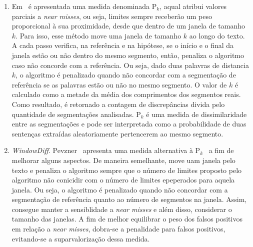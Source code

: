 \begin{enumerate}

\item Em~\cite{Beeferman1999} é apresentada uma medida denominada P$_k$, 
%
aqual atribui valores parciais a \textit{near misses}, ou seja, limites sempre receberão um peso proporcional à sua proximidade, desde que dentro de um janela de tamanho~$k$.
%
Para isso, esse método move uma janela de tamanho $k$ ao longo do texto. 
%
A cada passo verifica, na referência e na hipótese, se o início e o final da janela estão ou não dentro do mesmo segmento,
%
então, penaliza o algoritmo caso não concorde com a referência. Ou seja, dado duas palavras de distancia $k$, o algoritmo é penalizado quando não concordar com a segmentação de referência se as palavras estão ou não no mesmo segmento.
%
O valor de $k$ é calculado como a metade da média dos comprimentos dos segmentos reais. Como resultado, é retornado a contagem de discrepâncias divida pelo quantidade de segmentações analisadas. 
%
P$_k$ é uma medida de dissimilaridade entre as segmentações e pode ser interpretada como a probabilidade de duas sentenças extraídas aleatoriamente pertencerem ao mesmo segmento.

\item \textit{WindowDiff}. Pevzner~\cite{Pevzner2002} 
%
apresenta uma medida alternativa à P$_k$~\cite{Beeferman1999} a fim de melhorar alguns aspectos. 
%
De maneira semelhante, move uam janela pelo texto e penaliza o algoritmo sempre que o número de limites proposto pelo algoritmo não conicidir com o número de limites epeperados para aquela janela. Ou seja, o algoritmo é penalizado quando não concordar com a segmentação de referência quanto ao número de segmentos na janela. 
%
Assim, consegue manter a sensiblidade a \textit{near misses} e além disso, considerar o tamanho das janelas.
%
A fim de melhor equilibrar o peso dos falsos positivos em relação a \textit{near misses}, dobra-se a penalidade para falsos positivos, evitando-se a suparvalorização dessa medida. 


\end{enumerate}







